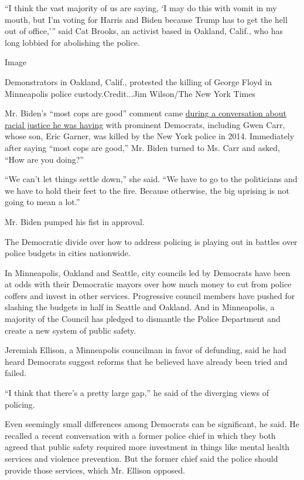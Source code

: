 ``I think the vast majority of us are saying, `I may do this with vomit
in my mouth, but I'm voting for Harris and Biden because Trump has to
get the hell out of office,''' said Cat Brooks, an activist based in
Oakland, Calif., who has long lobbied for abolishing the police.

Image

Demonstrators in Oakland, Calif., protested the killing of George Floyd
in Minneapolis police custody.Credit...Jim Wilson/The New York Times

Mr. Biden's ``most cops are good'' comment came
\href{https://youtu.be/hQq7ZSgvhtU?t=2144}{during a conversation about
racial justice he was having} with prominent Democrats, including Gwen
Carr, whose son, Eric Garner, was killed by the New York police in 2014.
Immediately after saying ``most cops are good,'' Mr. Biden turned to Ms.
Carr and asked, ``How are you doing?''

``We can't let things settle down,'' she said. ``We have to go to the
politicians and we have to hold their feet to the fire. Because
otherwise, the big uprising is not going to mean a lot.''

Mr. Biden pumped his fist in approval.

The Democratic divide over how to address policing is playing out in
battles over police budgets in cities nationwide.

In Minneapolis, Oakland and Seattle, city councils led by Democrats have
been at odds with their Democratic mayors over how much money to cut
from police coffers and invest in other services. Progressive council
members have pushed for slashing the budgets in half in Seattle and
Oakland. And in Minneapolis, a majority of the Council has pledged to
dismantle the Police Department and create a new system of public
safety.

Jeremiah Ellison, a Minneapolis councilman in favor of defunding, said
he had heard Democrats suggest reforms that he believed have already
been tried and failed.

``I think that there's a pretty large gap,'' he said of the diverging
views of policing.

Even seemingly small differences among Democrats can be significant, he
said. He recalled a recent conversation with a former police chief in
which they both agreed that public safety required more investment in
things like mental health services and violence prevention. But the
former chief said the police should provide those services, which Mr.
Ellison opposed.


